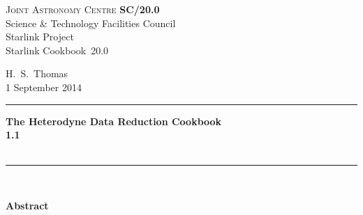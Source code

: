 \documentclass[twoside,11pt]{article}
\newcommand{\stardoccategory}  {Starlink Cookbook}
\newcommand{\stardocinitials}  {SC}
\newcommand{\stardocnumber}    {20.0}
\newcommand{\stardocauthors}   {H.\ S.\ Thomas}
\newcommand{\stardocdate}      {1 September 2014}
\newcommand{\stardoctitle}     {The Heterodyne Data Reduction Cookbook}
\newcommand{\stardocversion}   {1.1}
\newcommand{\stardocmanual}    {\ }
\newcommand{\stardocname}{\stardocinitials /\stardocnumber}
\newenvironment{latexonly}{}{}
\renewcommand{\_}{\texttt{\symbol{95}}}
\begin{document}
\thispagestyle{empty}

\begin{latexonly}
   \textsc{Joint Astronomy Centre} \hfill \textbf{\stardocname}\\
   {\large Science \& Technology Facilities Council}\\
   {\large Starlink Project\\}
   {\large \stardoccategory\ \stardocnumber}
   \begin{flushright}
   \stardocauthors\\
   \stardocdate
   \end{flushright}
   \vspace{-4mm}
   \rule{\textwidth}{0.5mm}
   \vspace{5mm}
   \begin{center}
   {\Huge\textbf{\stardoctitle \\ [2.5ex]}}
   {\LARGE\textbf{\stardocversion \\ [4ex]}}
   {\Huge\textbf{\stardocmanual}}
   \end{center}
   \vspace{5mm}

   \begin{center}
   \end{center}
   \vspace{5mm}
   \rule{\textwidth}{0.5mm}\\
   \vspace{15mm}

   \vspace{10mm}
   \begin{center}
      {\Large\textbf{Abstract}}
   \end{center}

\end{latexonly}
\end{document}

